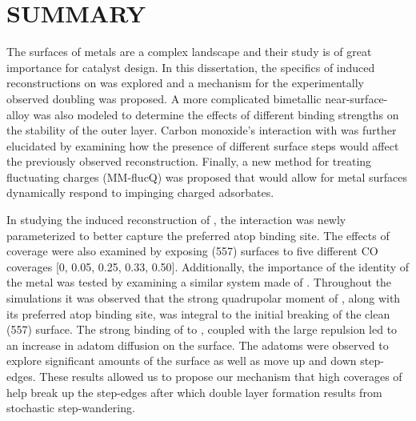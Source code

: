 \chapter{SUMMARY}

The surfaces of metals are a complex landscape and their study is of great
importance for catalyst design. In this dissertation, the specifics of 
induced reconstructions on  was explored and a mechanism for the
experimentally observed doubling was proposed. A more complicated bimetallic
 near-surface-alloy was also modeled to determine the effects
of different binding strengths on the stability of the outer  layer.
Carbon monoxide's interaction with  was further elucidated by examining
how the presence of different surface steps would affect the previously
observed reconstruction. Finally, a new method for treating fluctuating charges
(MM-flucQ) was proposed that would allow for metal surfaces dynamically respond
to impinging charged adsorbates.

In studying the induced reconstruction of , the 
interaction was newly parameterized to better capture the preferred atop
binding site. The effects of coverage were also examined by exposing (557)
 surfaces to five different CO coverages [0, 0.05, 0.25, 0.33, 0.50].
Additionally, the importance of the identity of the metal was tested by
examining a similar system made of . Throughout the simulations it was observed that the strong
quadrupolar moment of , along with its preferred atop binding site, was
integral to the initial breaking of the clean (557) surface. The strong binding
of  to , coupled with the large  repulsion led
to an increase in  adatom diffusion on the surface. The adatoms were
observed to explore significant amounts of the surface as well as move up and
down step-edges. These results allowed us to propose our mechanism that high
coverages of  help break up the step-edges after which double layer
formation results from stochastic step-wandering.

